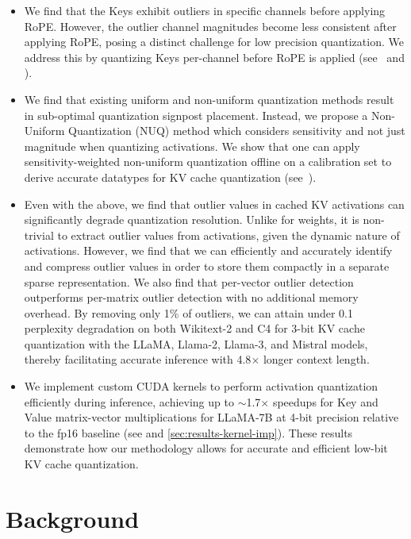 \begin{itemize}[leftmargin=3mm]
    \item We find that the Keys exhibit outliers in specific channels before applying RoPE. However, the outlier channel magnitudes become less consistent after applying RoPE, posing a distinct challenge for low precision quantization. We address this by quantizing Keys per-channel before RoPE is applied (see~ and ).
    \item 
    We find that existing uniform and non-uniform quantization methods result in sub-optimal quantization signpost placement. Instead, we propose a Non-Uniform Quantization (NUQ) method which considers sensitivity and not just magnitude when quantizing activations. We show that one can apply sensitivity-weighted non-uniform quantization offline on a calibration set to derive accurate datatypes for KV cache quantization (see~).
    \item 
    Even with the above, we find that outlier values in cached KV activations can significantly degrade quantization resolution. Unlike for weights, it is non-trivial to extract outlier values from activations, given the dynamic nature of activations. However, we find that we can efficiently and accurately identify and compress outlier values in order to store them compactly in a separate sparse representation. We also find that per-vector outlier detection outperforms per-matrix outlier detection with no additional memory overhead. By removing only 1\% of outliers, we can attain under 0.1 perplexity degradation on both Wikitext-2 and C4 for 3-bit KV cache quantization with the LLaMA, Llama-2, Llama-3, and Mistral models, thereby facilitating accurate inference with 4.8$\times$ longer context length.
    \item 
    We implement custom CUDA kernels to perform activation quantization efficiently during inference, achieving up to $\sim$1.7$\times$ speedups for Key and Value matrix-vector multiplications for LLaMA-7B at 4-bit precision relative to the fp16 baseline (see  and \ref{sec:results-kernel-imp}). 
    These results demonstrate how our methodology allows for accurate and efficient low-bit KV cache quantization. 
\end{itemize}

\section{Background}
\label{sec:background}

